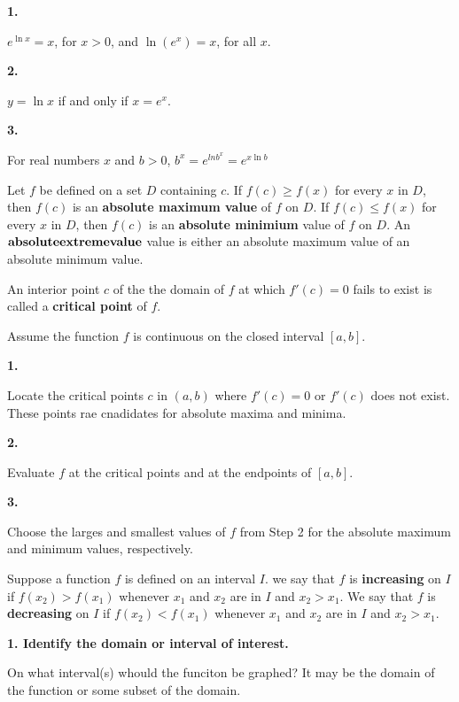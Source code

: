 {\par \bf 1.} $e^{\ln x} = x$, for $x > 0$, and $\ln(e^x) = x$, for all $x$.

{\par \bf 2.} $y = \ln x$ if and only if $x = e^x$.

{\par \bf 3.} For real numbers $x$ and $b > 0$, $b^x = e^{ln b^x} = e^{x \ln b}$

\enddef

Let $f$ be defined on a set $D$ containing $c$. If $f(c) \ge f(x)$
for every $x$ in $D$, then $f(c)$ is an {\bf absolute maximum value} of $f$
on $D$. If $f(c) \le f(x)$ for every $x$ in $D$, then
$f(c)$ is an {\bf absolute minimium} value of $f$ on $D$.
An ${\bf absolute extreme value}$ value is either an absolute
maximum value of an absolute minimum value.
\enddef

An interior point $c$ of the the domain of $f$ at which $f'(c) = 0$
fails to exist is called a {\bf critical point} of $f$.
\enddef

Assume the function $f$ is continuous on the closed interval
$[a, b]$.

{\par \bf 1.}
Locate the critical points $c$ in $(a, b)$ where $f'(c) = 0$ or
$f'(c)$ does not exist. These points rae cnadidates for absolute
maxima and minima.

{\par \bf 2.}
Evaluate $f$ at the critical points and at the endpoints of $[a, b]$.

{\par \bf 3.}
Choose the larges and smallest values of $f$ from Step 2 for
the absolute maximum and minimum values, respectively.

\enddef

Suppose a function $f$ is defined on an interval $I$. we say that
$f$ is {\bf increasing} on $I$ if $f(x_2) > f(x_1)$ whenever
$x_1$ and $x_2$ are in $I$ and $x_2 > x_1$. We say that
$f$ is {\bf decreasing} on $I$ if $f(x_2) < f(x_1)$ whenever
$x_1$ and $x_2$ are in $I$ and $x_2 > x_1$.
\enddef

{\par \bf 1. Identify the domain or interval of interest.}
On what interval(s) whould the funciton be graphed? It may
be the domain of the function or some subset of the domain.

